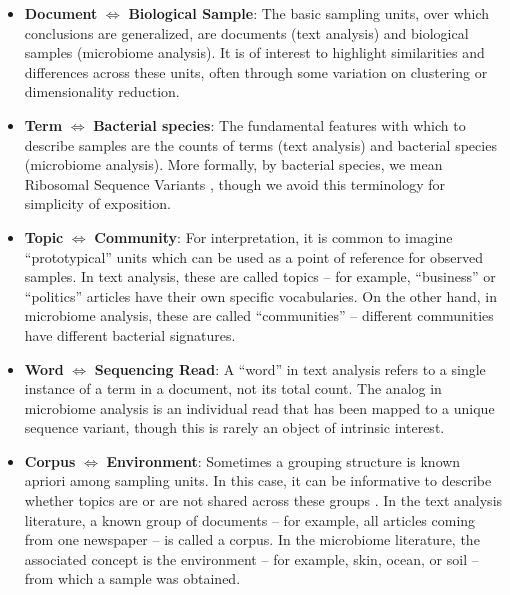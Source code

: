 \documentclass[oupdraft]{bio}
\begin{document}
\begin{itemize}
  \item \textbf{Document} $\iff$ \textbf{Biological Sample}: The basic sampling
    units, over which conclusions are generalized, are documents (text analysis)
    and biological samples (microbiome analysis). It is of interest to highlight
    similarities and differences across these units, often through some
    variation on clustering or dimensionality reduction.
  \item \textbf{Term} $\iff$ \textbf{Bacterial species}: The fundamental
    features with which to describe samples are the counts of terms (text
    analysis) and bacterial species (microbiome analysis). More formally, by
    bacterial species, we mean Ribosomal Sequence Variants
    \citep{callahan2016dada2}, though we avoid this terminology for simplicity
    of exposition.
  \item \textbf{Topic} $\iff$ \textbf{Community}: For interpretation, it is
    common to imagine ``prototypical'' units which can be used as a point of
    reference for observed samples. In text analysis, these are called topics --
    for example, ``business'' or ``politics'' articles have their own specific
    vocabularies. On the other hand, in microbiome analysis, these are called
    ``communities'' -- different communities have different bacterial
    signatures.
  \item \textbf{Word} $\iff$ \textbf{Sequencing Read}: A ``word'' in text analysis refers
    to a single instance of a term in a document, not its total count. The
    analog in microbiome analysis is an individual read that has been mapped to
    a unique sequence variant, though this is rarely an object of intrinsic interest.
  \item \textbf{Corpus} $\iff$ \textbf{Environment}: Sometimes a grouping
    structure is known apriori among sampling units. In this case, it can be
    informative to describe whether topics are or are not shared across these
    groups \citep{teh2004sharing}. In the text analysis literature, a known group
    of documents -- for example, all articles coming from one newspaper -- is
    called a corpus. In the microbiome literature, the associated concept is the
    environment -- for example, skin, ocean, or soil -- from which a sample was
    obtained.
\end{itemize}
\end{document}
